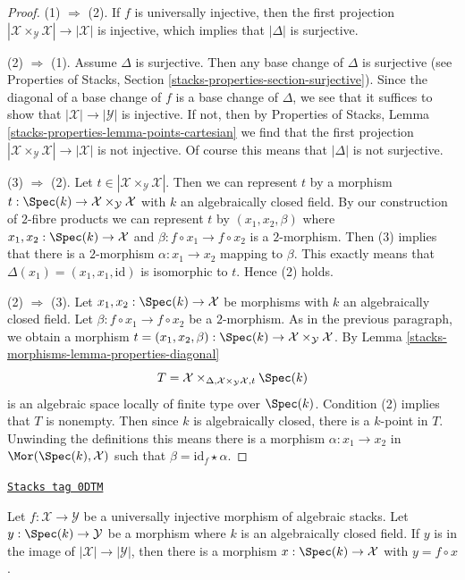 \begin{proof}
(1) $\Rightarrow$ (2). If $f$ is universally injective, then the
first projection
$|\mathcal{X} \times_\mathcal{Y} \mathcal{X}| \to |\mathcal{X}|$
is injective, which implies that $|\Delta|$ is surjective.

\medskip\noindent
(2) $\Rightarrow$ (1). Assume $\Delta$ is surjective. Then any base change
of $\Delta$ is surjective (see Properties of Stacks, Section
\ref{stacks-properties-section-surjective}).
Since the diagonal of a base change
of $f$ is a base change of $\Delta$, we see that it suffices
to show that $|\mathcal{X}| \to |\mathcal{Y}|$ is injective.
If not, then by Properties of Stacks, Lemma
\ref{stacks-properties-lemma-points-cartesian}
we find that the first projection
$|\mathcal{X} \times_\mathcal{Y} \mathcal{X}| \to |\mathcal{X}|$
is not injective. Of course this means that $|\Delta|$ is not
surjective.

\medskip\noindent
(3) $\Rightarrow$ (2). Let
$t \in |\mathcal{X} \times_\mathcal{Y} \mathcal{X}|$.
Then we can represent $t$ by a morphism
$t : \Spec(k) \to \mathcal{X} \times_\mathcal{Y} \mathcal{X}$
with $k$ an algebraically closed field.
By our construction of $2$-fibre products we can represent
$t$ by $(x_1, x_2, \beta)$ where $x_1, x_2 : \Spec(k) \to \mathcal{X}$
and $\beta : f \circ x_1 \to f \circ x_2$ is a $2$-morphism.
Then (3) implies that there is a $2$-morphism
$\alpha : x_1 \to x_2$ mapping to $\beta$.
This exactly means that $\Delta(x_1) = (x_1, x_1, \text{id})$
is isomorphic to $t$. Hence (2) holds.

\medskip\noindent
(2) $\Rightarrow$ (3). Let $x_1, x_2 : \Spec(k) \to \mathcal{X}$
be morphisms with $k$ an algebraically closed field. Let
$\beta : f \circ x_1 \to f \circ x_2$ be a $2$-morphism.
As in the previous paragraph, we obtain a morphism
$t = (x_1, x_2, \beta) :
\Spec(k) \to \mathcal{X} \times_\mathcal{Y} \mathcal{X}$.
By Lemma \ref{stacks-morphisms-lemma-properties-diagonal}
$$
T = \mathcal{X}
\times_{\Delta, \mathcal{X} \times_\mathcal{Y} \mathcal{X}, t} \Spec(k)
$$
is an algebraic space locally of finite type over $\Spec(k)$.
Condition (2) implies that $T$ is nonempty. Then since $k$ is
algebraically closed, there is a $k$-point in $T$.
Unwinding the definitions this means there is a morphism
$\alpha : x_1 \to x_2$ in $\Mor(\Spec(k), \mathcal{X})$
such that $\beta = \text{id}_f \star \alpha$.
\end{proof}

\begin{lemma}
\label{stacks-morphisms-lemma-universally-injective-point}
\href{https://stacks.math.columbia.edu/tag/0DTM}{\texttt{Stacks tag 0DTM}}

Let $f : \mathcal{X} \to \mathcal{Y}$ be a universally injective
morphism of algebraic stacks. Let $y : \Spec(k) \to \mathcal{Y}$
be a morphism where $k$ is an algebraically closed field.
If $y$ is in the image of $|\mathcal{X}| \to |\mathcal{Y}|$,
then there is a morphism $x : \Spec(k) \to \mathcal{X}$
with $y = f \circ x$.
\end{lemma}

